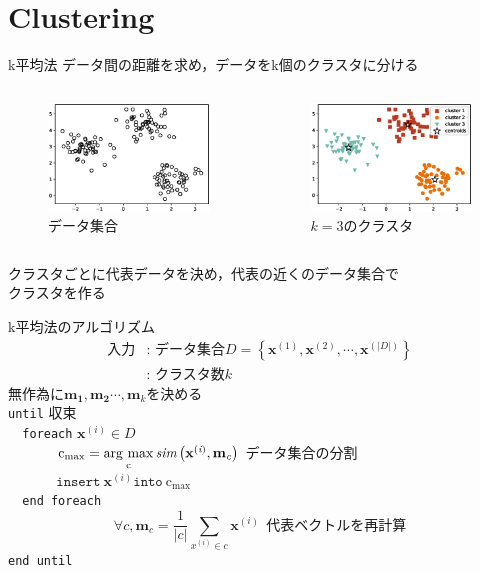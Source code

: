 \documentclass[dvipdfmx,platex]{beamer}
\newcommand{\argmax}{\mathop{\rm arg~max}\limits}
\begin{document}
\section{Clustering}
\begin{frame}{{\mgfamily k平均法}}
  データ間の距離を求め，データをk個のクラスタに分ける
  \begin{columns}[T,onlytextwidth]
    \begin{figure}
      \centering
      \includegraphics[width=5cm]{fig/cluster.eps}
      \caption{{\mgfamily データ集合}}
    \end{figure}
    \begin{figure}
      \centering
      \includegraphics[width=5cm]{fig/colored_scatter.eps}
      \caption{$k=3${\mgfamily のクラスタ}}
    \end{figure}
  \end{columns}
  クラスタごとに代表データを決め，代表の近くのデータ集合で\\クラスタを作る
\end{frame}
\begin{frame}{{\mgfamily k平均法のアルゴリズム}}
  \begin{align*}
    \text{入力}&\text{: データ集合}D=\left\{\mathbf{x}^{(1)},\mathbf{x}^{(2)},\cdots,\mathbf{x}^{(|D|)} \right\}\\
   &\text{: クラスタ数}k
  \end{align*}  
  無作為に$\mathbf{m_1}, \mathbf{m_2}\cdots,\mathbf{m_{\textit{k}}}$を決める\\
\texttt{until} 収束\\
\texttt{\ \ foreach} $\mathbf{x^{(\textit{i})}}\in D$\\
\textbf{\ \ \ \ \ \ }$\textrm{c}_{\textrm{max}} = \argmax_{\textrm{c}} \textit{\textrm{sim}}\left(\mathbf{x}^{(\textit{i})},\textbf{m}_{\textit{c}}\right)$ データ集合の分割\\
\textbf{\ \ \ \ \ \ }$\texttt{insert}\ \mathbf{x}^{(\textit{i})}\texttt{into}\ \textrm{c}_{\textrm{max}}$\\
\texttt{\ \ end\ foreach}
\[
\forall \textit{c}, \mathbf{m}_{\textit{c}}=\frac{1}{|\textit{c}|}\sum_{\textit{x}^{(i)}\in \textit{c}}\mathbf{x}^{(\textit{i})}\ \ \text{代表ベクトルを再計算}
\]
\texttt{end until}
\end{frame}
\end{document}
